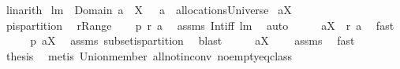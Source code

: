 \begin{isabellebody}
\ linarith\isanewline
{}\isamarkupfalse%
%
\endisatagproof
{\isafoldproof}%
%
\isadelimproof
\isanewline
%
\endisadelimproof
\isanewline
{}\isamarkupfalse%
\ lm{}{}{\isacharcolon}\ \ {\isachardoublequoteopen}Domain\ a\ {\isasyminter}\ X\ {\isasymnoteq}\ {\isacharbraceleft}{\isacharbraceright}{\isachardoublequoteclose}\ {\isachardoublequoteopen}a\ {\isasymin}\ allocationsUniverse{\isachardoublequoteclose}\ \isanewline
{\isachardoublequoteopen}{\isasymUnion}{\isacharparenleft}a{\isacharbackquote}{\isacharbackquote}X{\isacharparenright}\ {\isasymnoteq}\ {\isacharbraceleft}{\isacharbraceright}{\isachardoublequoteclose}\ \isanewline
%
\isadelimproof
%
\endisadelimproof
%
\isatagproof
{}\isamarkupfalse%
\ {\isacharminus}\isanewline
\ \ \isamarkupfalse%
\ {\isacharquery}p{\isacharequal}is{\isacharunderscore}partition\ \isamarkupfalse%
\ {\isacharquery}r{\isacharequal}Range\isanewline
\ \ \isamarkupfalse%
\ {\isachardoublequoteopen}{\isacharquery}p\ {\isacharparenleft}{\isacharquery}r\ a{\isacharparenright}{\isachardoublequoteclose}\ \isamarkupfalse%
\ assms\ Int{\isacharunderscore}iff\ lm{}{}\ \isamarkupfalse%
\ auto\isanewline
\ \ \isamarkupfalse%
\ \isamarkupfalse%
\ {\isachardoublequoteopen}a{\isacharbackquote}{\isacharbackquote}X\ {\isasymsubseteq}\ {\isacharquery}r\ a{\isachardoublequoteclose}\ \isamarkupfalse%
\ fast\isanewline
\ \ \isamarkupfalse%
\ \isamarkupfalse%
\ {\isachardoublequoteopen}{\isacharquery}p\ {\isacharparenleft}a{\isacharbackquote}{\isacharbackquote}X{\isacharparenright}{\isachardoublequoteclose}\ \isamarkupfalse%
\ assms\ subset{\isacharunderscore}is{\isacharunderscore}partition\ \isamarkupfalse%
\ blast\isanewline
\ \ \isamarkupfalse%
\ \isamarkupfalse%
\ {\isachardoublequoteopen}a{\isacharbackquote}{\isacharbackquote}X\ {\isasymnoteq}\ {\isacharbraceleft}{\isacharbraceright}{\isachardoublequoteclose}\ \isamarkupfalse%
\ assms\ \isamarkupfalse%
\ fast\isanewline
\ \ \isamarkupfalse%
\ \isamarkupfalse%
\ {\isacharquery}thesis\ \isamarkupfalse%
\ {\isacharparenleft}metis\ Union{\isacharunderscore}member\ all{\isacharunderscore}not{\isacharunderscore}in{\isacharunderscore}conv\ no{\isacharunderscore}empty{\isacharunderscore}eq{\isacharunderscore}class{\isacharparenright}\isanewline

\end{isabellebody}
